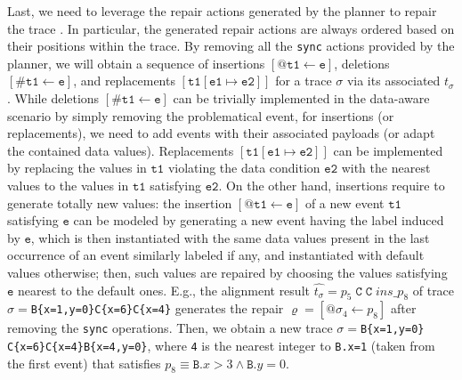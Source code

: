 Last, we need to leverage the repair actions generated by the planner to repair the  trace . In particular, the generated repair actions are always ordered based on their positions within the trace. By removing all the \texttt{sync} actions provided by the planner, we will obtain a sequence of insertions $[@\texttt{t1}\leftarrow \texttt{e}]$, deletions $[\#\texttt{t1}\leftarrow \texttt{e}]$, and replacements $[\texttt{t1}[ \texttt{e1}\mapsto  \texttt{e2}]]$ for a trace $\sigma$ via its associated $t_\sigma$. While deletions $[\#\texttt{t1}\leftarrow \texttt{e}]$ can be trivially implemented in the data-aware scenario by simply removing the problematical event, %
for insertions (or replacements), we need to add events with their associated payloads (or adapt the contained data values). Replacements $[\texttt{t1}[\texttt{e1}\mapsto  \texttt{e2}]]$ can be implemented by replacing the values in $\texttt{t1}$ violating the data condition $\texttt{e2}$ with the nearest values to the values in $\texttt{t1}$ satisfying $\texttt{e2}$. On the other hand, insertions require to generate totally new values: the insertion $[@\texttt{t1}\leftarrow \texttt{e}]$ of a new event $\texttt{t1}$ satisfying $\texttt{e}$ can be modeled by generating a new event having the label induced by $\texttt{e}$, which is then instantiated with the same data values present in the last occurrence of an event similarly labeled if any, and instantiated with default values otherwise; then, such values are repaired by choosing the values satisfying $\texttt{e}$ nearest to the default ones.
%
E.g., the alignment result $\hat{t_\sigma}=p_5\;\texttt{C}\;\texttt{C}\;\textit{ins\_}p_8$ of trace $\sigma=$\texttt{B\{x=1,y=0\}C\{x=6\}C\{x=4\}} generates the repair $\varrho=[@\sigma_4\leftarrow p_8]$ after removing the \texttt{sync} operations. Then, we obtain a new trace $\sigma=$\texttt{B\{x=1,y=0\}$  $C\{x=6\}C\{x=4\}B\{x=4,y=0\}}, where \texttt{4} is the nearest integer to \texttt{B.x=1} (taken from the first event) that satisfies $p_8\equiv\texttt{B}.x>3\wedge \texttt{B}.y=0$. 